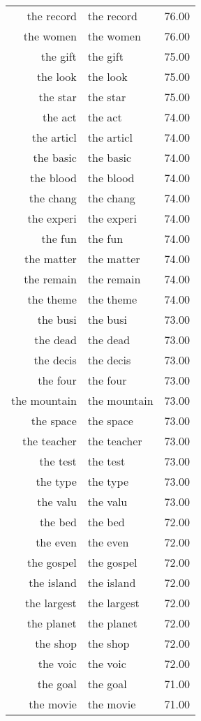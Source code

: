 \begin{table}[ht]
\begin{tabular}{rlr}
  the record & the record & 76.00 \\ 
  the women & the women & 76.00 \\ 
  the gift & the gift & 75.00 \\ 
  the look & the look & 75.00 \\ 
  the star & the star & 75.00 \\ 
  the act & the act & 74.00 \\ 
  the articl & the articl & 74.00 \\ 
  the basic & the basic & 74.00 \\ 
  the blood & the blood & 74.00 \\ 
  the chang & the chang & 74.00 \\ 
  the experi & the experi & 74.00 \\ 
  the fun & the fun & 74.00 \\ 
  the matter & the matter & 74.00 \\ 
  the remain & the remain & 74.00 \\ 
  the theme & the theme & 74.00 \\ 
  the busi & the busi & 73.00 \\ 
  the dead & the dead & 73.00 \\ 
  the decis & the decis & 73.00 \\ 
  the four & the four & 73.00 \\ 
  the mountain & the mountain & 73.00 \\ 
  the space & the space & 73.00 \\ 
  the teacher & the teacher & 73.00 \\ 
  the test & the test & 73.00 \\ 
  the type & the type & 73.00 \\ 
  the valu & the valu & 73.00 \\ 
  the bed & the bed & 72.00 \\ 
  the even & the even & 72.00 \\ 
  the gospel & the gospel & 72.00 \\ 
  the island & the island & 72.00 \\ 
  the largest & the largest & 72.00 \\ 
  the planet & the planet & 72.00 \\ 
  the shop & the shop & 72.00 \\ 
  the voic & the voic & 72.00 \\ 
  the goal & the goal & 71.00 \\ 
  the movie & the movie & 71.00 \\ 

\end{tabular}
\end{table}

